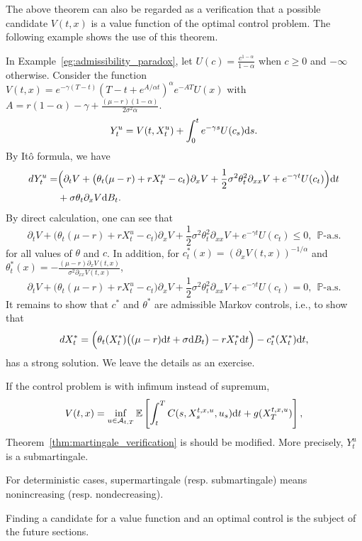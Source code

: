 \documentclass[11pt]{book}
\newcommand{\dd}{\text{\normalfont d}}
\newcommand{\dt}{\text{\normalfont d}t}
\newcommand{\ds}{\text{\normalfont d}s}
\begin{document}
The above theorem can also be regarded as a verification that a possible candidate $V(t,x)$ is a value function of the optimal control problem. The following example shows the use of this theorem.
\begin{eg}\label{eg:martingle_consumption}
In Example~\ref{eg:admissibility_paradox}, let $U(c)=\frac{c^{1-\alpha}}{1-\alpha}$ when $c\ge0$ and $-\infty$ otherwise. Consider the function $V(t,x)=e^{-\gamma (T-t)}(T-t+e^{A/\alpha t})^{\alpha}e^{-AT}U(x)$ with $A=r(1-\alpha)-\gamma+\frac{(\mu-r)(1-\alpha)}{2\sigma^2\alpha}$.
	\begin{equation}
		Y^u_t=V(t,X_t^u)+\int_0^te^{-\gamma s}U(c_s){{\ds}}.
	\end{equation}
	By It\^o formula, we have 
	\begin{equation}
	\begin{split}
				dY_t^u=&\Big(\partial_t V+ \big(\theta_t(\mu-r)+rX^u_t-c_t\big)\partial_x V+ 
\frac12\sigma^2\theta_t^2\partial_{xx} V+e^{-\gamma t}U(c_t)\Big){{\dt}}\\
		&+\sigma\theta_t\partial_x V {\dd}B_t. 
	\end{split}
	\end{equation}
	By direct calculation, one can see that 
	\begin{equation}
		\partial_t V+ \big(\theta_t(\mu-r)+rX^u_t-c_t\big)\partial_x V
		+\frac12\sigma^2\theta_t^2\partial_{xx} V+e^{-\gamma t}U(c_t)\le0,~~\mathbb{P}\textrm{-a.s.}
	\end{equation}
	for all values of  $\theta$ and $c$. In addition, for $c^*_t(x)=(\partial_x V(t,x))^{-1/\alpha}$ and $\theta^*_t(x)=-\frac{(\mu-r)\partial_xV(t,x)}{\sigma^2\partial_{xx}V(t,x)}$, 
	\begin{equation}
		\partial_t V+ \big(\theta_t(\mu-r)+rX^u_t-c_t\big)\partial_x V
		+\frac12\sigma^2\theta_t^2\partial_{xx} V+e^{-\gamma t}U(c_t)=0,~~\mathbb{P}\textrm{-a.s.}
	\end{equation}
It remains to show that $c^*$ and $\theta^*$ are admissible Markov controls, i.e., to show that 
	\begin{equation}
		dX^*_t=\Big(\theta_t(X^*_t)\big((\mu-r) {{\dt}}+\sigma {\dd}B_t\big)-rX^*_t{{\dt}}\Big)-c^*_t(X^*_t){{\dt}},
	\end{equation}
	has a strong solution. We leave the details as an exercise. 
\end{eg}
\begin{rem}\label{rem:inf_submartingale}
If the control problem is with infimum instead of supremum,
\begin{equation}
V(t,x)=\inf_{u\in\mathcal{A}_{t,T}}\mathbb{E}\left[\int_{t}^{T}C(s,X_s^{t,x,u},u_s){{\dt}}+g(X_T^{t,x,u})\right],
\end{equation}
Theorem~\ref{thm:martingale_verification} is should be modified. More precisely, $Y_t^u$ is a submartingale. 

For deterministic cases, supermartingale (resp. submartingale) means nonincreasing (resp. nondecreasing).
\end{rem}
Finding a candidate for a value function and an optimal control is the subject of the future sections.
\end{document}
